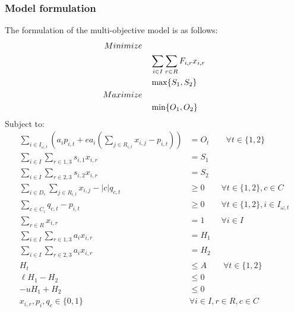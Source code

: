 \subsubsection{Model formulation}
The formulation of the multi-objective model is as follows:
\begin{align}
Minimize \quad & \notag\\
&\sum_{i\in I}\sum_{r\in R} F_{i,r} x_{i,r} \label{eqn:objFire} \\
&\max \{S_1,S_2\} \label{eqn:objSediment} \\
Maximize \quad & \notag\\
&\min \{O_1,O_2\} \label{eqn:objOwl}
\end{align}
Subject to:
\begin{align}
\sum_{i\in I_{\omega,t}} \left(a_i p_{i,t} + e a_i \left( \sum_{j \in R_{i,t}} x_{i,j}-p_{i,t} \right) \right) &= O_t \qquad \forall t \in \{1,2\} \label{eqn:constraintDefOwl}\\
\sum_{i\in I} \sum_{r\in 1,3} s_{i,1} x_{i,r} &= S_1 \label{eqn:constraintSediment1} \\
\sum_{i\in I} \sum_{r\in 2,3} s_{i,2} x_{i,r} &= S_2 \label{eqn:constraintSediment2} \\
\sum_{i \in D_c} \sum_{j \in R_{i,t}} x_{i,j} - |c| q_{c,t} &\ge 0 \qquad \forall t \in \{1,2\}, c \in C \label{eqn:constraintClusterTriggers} \\
\sum_{c \in C_i} q_{c,t} - p_{i,t} &\ge 0 \qquad \forall t \in \{1,2\}, i \in I_{\omega,t} \label{eqn:constraintPVarTriggers} \\
\sum_{r \in R} x_{i,r} &= 1  \qquad \forall i \in I \label{eqn:constraintOnePrescrip} \\
\sum_{i \in I} \sum_{r \in 1,3} a_i x_{i,r} &= H_1 \label{eqn:constraintAreaAcctg1} \\
\sum_{i \in I} \sum_{r \in 2,3} a_i x_{i,r} &= H_2 \label{eqn:constraintAreaAcctg2} \\
H_t &\le A \qquad \forall t \in \{1,2\} \label{eqn:constraintAreaRestr} \\
\ell H_1 - H_2 &\le 0 \label{eqn:constraintAreaFlucL} \\
-u H_1 + H_2 &\le 0 \label{eqn:constraintAreaFlucU} \\
x_{i,r}, p_i, q_c \in \{0,1\} \quad &\forall i \in I, r \in R, c \in C \label{eqn:constraintNonNeg}
\end{align}


